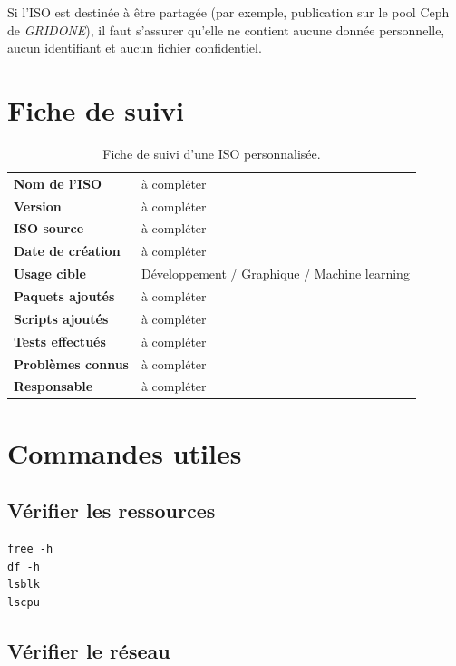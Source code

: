 Si l'ISO est destinée à être partagée (par exemple, publication sur le pool Ceph de \emph{GRIDONE}), il faut s'assurer qu'elle ne contient aucune donnée personnelle, aucun identifiant et aucun fichier confidentiel.

\section{Fiche de suivi}

\begin{table}[H]
\centering
\caption{Fiche de suivi d'une ISO personnalisée.}
\begin{tabular}{>{\bfseries}p{5cm}p{9cm}}
\toprule
Nom de l'ISO        & à compléter \\
Version             & à compléter \\
ISO source          & à compléter \\
Date de création    & à compléter \\
Usage cible         & Développement / Graphique / Machine learning \\
Paquets ajoutés     & à compléter \\
Scripts ajoutés     & à compléter \\
Tests effectués     & à compléter \\
Problèmes connus    & à compléter \\
Responsable         & à compléter \\
\bottomrule
\end{tabular}

\end{table}

\section{Commandes utiles}

\subsection{Vérifier les ressources}

\begin{lstlisting}[basicstyle=\ttfamily\footnotesize, frame=single]
free -h
df -h
lsblk
lscpu
\end{lstlisting}

\subsection{Vérifier le réseau}

